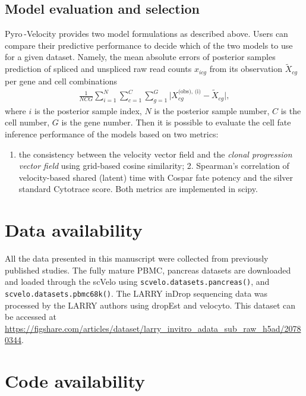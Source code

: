 \documentclass[
  sn-mathphys-num,
  lineno,
  twocolumn]{sn-jnl}
\providecommand{\tightlist}{%
  \setlength{\itemsep}{0pt}\setlength{\parskip}{0pt}}\usepackage{longtable,booktabs,array}
\begin{document}
\subsection{Model evaluation and
selection}\label{sec-methods-model-selection}

Pyro -Velocity provides two model formulations as described above. Users
can compare their predictive performance to decide which of the two
models to use for a given dataset. Namely, the mean absolute errors of
posterior samples prediction of spliced and unspliced raw read counts
\(x_{icg}\) from its observation \(\tilde{X}_{cg}\) per gene and cell
combinations \begin{align*}
\frac{1}{N C G} \sum_{i=1}^{N} \sum_{c=1}^{C} \sum_{g=1}^{G} 
  \vert X^{\text{(obs), (i)}}_{cg} - \tilde{X}_{cg} \vert,
\end{align*} where \(i\) is the posterior sample index, \(N\) is the
posterior sample number, \(C\) is the cell number, \(G\) is the gene
number. Then it is possible to evaluate the cell fate inference
performance of the models based on two metrics:

\begin{enumerate}
\def\labelenumi{\arabic{enumi}.}
\tightlist
\item
  the consistency between the velocity vector field and the \emph{clonal
  progression vector field} using grid-based cosine similarity; 2.
  Spearman's correlation of velocity-based shared (latent) time with
  Cospar fate potency and the silver standard Cytotrace score. Both
  metrics are implemented in scipy.
\end{enumerate}

\section{Data availability}\label{data-availability}

All the data presented in this manuscript were collected from previously
published studies. The fully mature PBMC, pancreas datasets are
downloaded and loaded through the scVelo using
\texttt{scvelo.datasets.pancreas()}, and
\texttt{scvelo.datasets.pbmc68k()}. The LARRY inDrop sequencing data was
processed by the LARRY authors using dropEst \citep{Petukhov2018-nr} and
velocyto. This dataset can be accessed at
\url{https://figshare.com/articles/dataset/larry_invitro_adata_sub_raw_h5ad/20780344}.

\section{Code availability}\label{code-availability}
\end{document}
